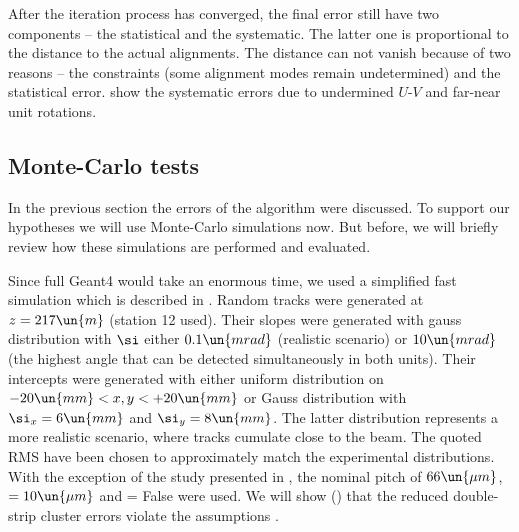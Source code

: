 After the iteration process has converged, the final error still have two components -- the statistical and the systematic. The latter one is proportional to the distance to the actual alignments. The distance can not vanish because of two reasons -- the constraints (some alignment modes remain undetermined) and the statistical error.  show the systematic errors due to undermined $U$-$V$ and far-near unit rotations. 




\subsection[al mc tests]{Monte-Carlo tests}


In the previous section the errors of the algorithm were discussed. To support our hypotheses we will use Monte-Carlo simulations now. But before, we will briefly review how these simulations are performed and evaluated.

Since full Geant4 would take an enormous time, we used a simplified fast simulation which is described in . Random tracks were generated at $z=217\un{m}$ (station 12 used). Their slopes were generated with gauss distribution with $\si$ either $0.1\un{mrad}$ (realistic scenario) or $10\un{mrad}$ (the highest angle that can be detected simultaneously in both units). Their intercepts were generated with either uniform distribution on $ -20\un{mm} < x, y < +20\un{mm}$ or Gauss distribution with $\si_x = 6\un{mm}$ and $\si_y = 8\un{mm}$. The latter distribution represents a more realistic scenario, where tracks cumulate close to the beam. The quoted RMS have been chosen to approximately match the experimental distributions. With the exception of the study presented in \Fg{}, the nominal pitch of $66\un{\mu m}$, $=10\un{\mu m}$ and  = False were used. We will show () that the reduced double-strip cluster errors violate the assumptions .

